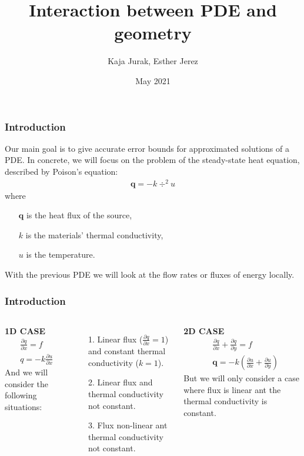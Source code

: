 \documentclass[t]{beamer}
\title{Interaction between PDE and geometry}
\author[MAT264] 
{Kaja Jurak, Esther Jerez}
\institute[UIB]
{
  Faculty of Mathematics\\
  University of Bergen
  
}
\date[2021]
{May 2021}
\begin{document}
    \frame{\titlepage}
    \begin{frame}
        \frametitle{Introduction}
        Our main goal is to give accurate error bounds for approximated solutions of a PDE. In concrete, we will focus on the problem of the steady-state heat equation, described by  \alert{Poison's equation}:
        \begin{align*}
            \bm{q} = -k \div ^2 u
        \end{align*}
    where 
    \begin{enumerate}
        \item[] $\bm{q}$ is the heat flux of the source,
        \item[] $k$ is the materials' thermal conductivity,
        \item[] $u$ is the temperature.
    \end{enumerate}
    With the previous PDE we will look at the flow rates or fluxes of energy locally. \\

    
    \end{frame}

    \begin{frame}
        \frametitle{Introduction}
        \begin{columns}[t]
            \textbf{1D CASE}
            \begin{align*}
                &\frac{\partial q}{\partial x} = f \\
                &q = -k \frac{\partial u}{\partial x} 
            \end{align*}
            And we will consider the following situations:
            \begin{itemize}
                \item[1.] Linear flux ($\frac{\partial q}{\partial x} = 1$) and constant thermal conductivity ($k=1$).
                \item[2.] Linear flux and thermal conductivity not constant.
                \item[3.] Flux non-linear ant thermal conductivity not constant.
            \end{itemize}
            
            \textbf{2D CASE} \\
            \begin{align*}
                &\frac{\partial q}{\partial x} + \frac{\partial q}{\partial y}  = f \\
                &\bm{q} = -k \left( \frac{\partial u}{\partial x} + \frac{\partial u}{\partial y}\right)
            \end{align*}
            But we will only consider a case where flux is linear ant the thermal conductivity is constant.
        \end{columns}        
    \end{frame}
\end{document}
